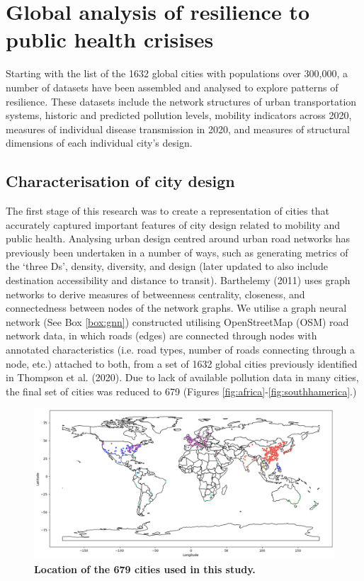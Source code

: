 \documentclass[preprint,10pt]{elsarticle} %
\begin{document}
\section*{\textcolor{OliveGreen}{Global analysis of resilience to public health crisises}}

Starting with the list of the 1632 global cities with populations over 300,000\cite{UNDESA2019}, a number of datasets have been assembled and analysed to explore patterns of resilience. These datasets include the network structures of urban transportation systems, historic and predicted pollution levels, mobility indicators across 2020, measures of individual disease transmission in 2020, and measures of structural dimensions of each individual city's design.

\subsection*{Characterisation of city design}
The first stage of this research was to create a representation of cities that accurately captured important features of city design related to mobility and public health. Analysing urban design centred around urban road networks has previously been undertaken in a number of ways, such as generating metrics of the `three Ds'\cite{Ewing2010}, density, diversity, and design (later updated to also include destination accessibility and distance to transit). Barthelemy (2011)\cite{Barthelemy2011} uses graph networks to derive measures of betweenness centrality, closeness, and connectedness between nodes of the network graphs. We utilise a graph neural network (See Box \ref{box:gnn}) constructed utilising OpenStreetMap (OSM) road network data\cite{Boeing2017a}, in which roads (edges) are connected through nodes with annotated characteristics (i.e. road types, number of roads connecting through a node, etc.) attached to both, from a set of 1632 global cities previously identified in Thompson et al. (2020)\cite{Thompson2020}. Due to lack of available pollution data in many cities, the final set of cities was reduced to 679 (Figures \ref{fig:africa}-\ref{fig:southhamerica}.) 


\begin{figure}
\centering
\includegraphics[trim={0 0 0 0},clip,scale=0.4]{Images/ByCountry_map_Zeigler.png}
\caption{\bf Location of the 679 cities used in this study.}
 \label{fig:clusters}
\end{figure}
\end{document}

